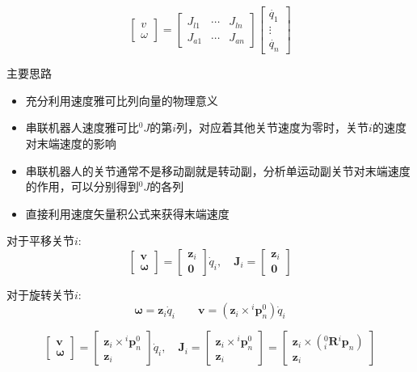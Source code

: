 $$
\begin{bmatrix}v \\ \omega \end{bmatrix} = \begin{bmatrix}J_{l1} & \cdots & J_{ln} \\ J_{a1} & \cdots & J_{an} \end{bmatrix} \begin{bmatrix}\dot{q_1} \\ \vdots \\ \dot{q_n} \end{bmatrix}
$$

主要思路
\begin{itemize}
    \item 充分利用速度雅可比列向量的物理意义
    \item 串联机器人速度雅可比${}^0J$的第$i$列，对应着其他关节速度为零时，关节$i$的速度对末端速度的影响
    \item 串联机器人的关节通常不是移动副就是转动副，分析单运动副关节对末端速度的作用，可以分别得到${}^0J$的各列
    \item 直接利用速度矢量积公式来获得末端速度
\end{itemize}

对于平移关节$i$:
$$\begin{bmatrix} \boldsymbol{v} \\ \boldsymbol{\omega} \end{bmatrix} = \begin{bmatrix} \boldsymbol{z}_i \\ \boldsymbol{0} \end{bmatrix} \dot{q}_i, \quad \boldsymbol{J}_i = \begin{bmatrix} \boldsymbol{z}_i \\ \boldsymbol{0} \end{bmatrix}$$

对于旋转关节$i$:
$$\boldsymbol{\omega} = \boldsymbol{z}_i \dot{q}_i \qquad \boldsymbol{v} = (\boldsymbol{z}_i \times {}^i\boldsymbol{p}_n^0) \dot{q}_i$$

$$\begin{bmatrix} \boldsymbol{v} \\ \boldsymbol{\omega} \end{bmatrix} = \begin{bmatrix} \boldsymbol{z}_i \times {}^i\boldsymbol{p}_n^0 \\ \boldsymbol{z}_i \end{bmatrix} \dot{q}_i, \quad \boldsymbol{J}_i = \begin{bmatrix} \boldsymbol{z}_i \times {}^i\boldsymbol{p}_n^0 \\ \boldsymbol{z}_i \end{bmatrix} = \begin{bmatrix} \boldsymbol{z}_i \times ({}_i^0\boldsymbol{R} {}^i\boldsymbol{p}_n) \\ \boldsymbol{z}_i \end{bmatrix}$$

